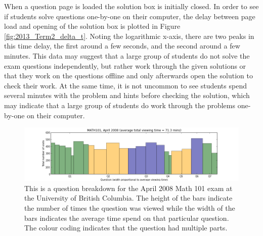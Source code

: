 \documentclass{primus}
\begin{document}
\noindent{}When a question page is loaded the solution box is initially closed. In order to see if students solve questions one-by-one on their computer, the delay between page load and opening of the solution box is plotted in Figure \ref{fig:2013_Term2_delta_t}. Noting the logarithmic x-axis, there are two peaks in this time delay, the first around a few seconds, and the second around a few minutes. This data may suggest that a large group of students do not solve the exam questions independently, but rather work through the given solutions or that they work on the questions offline and only afterwards open the solution to check their work. At the same time, it is not uncommon to see students spend several minutes with the problem and hints before checking the solution, which may indicate that a large group of students do work through the problems one-by-one on their computer.

\begin{figure}[H]
\centering
\includegraphics[width=\textwidth]{figs/question_dist_MATH101April_2008.png}
\caption{This is a question breakdown for the April 2008 Math 101 exam at the University of British Columbia. The height of the bars indicate the number of times the question was viewed while the width of the bars indicates the average time spend on that particular question. The colour coding indicates that the question had multiple parts.}\label{fig:question_dist_MATH101April_2008}
\end{figure}
\end{document}
